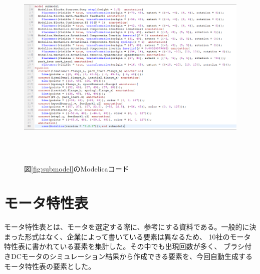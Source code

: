   \begin{figure}[t]
	\centering
	\includegraphics[width=16.5cm,height=10cm]{./Image/sub_modelica.png}
	\caption{図\ref{fig:submodel}のModelicaコード}
	\label{fig:sub_modelica}
  \end{figure}
\section{モータ特性表}\label{mortoku}
モータ特性表とは、モータを選定する際に、参考にする資料である\cite{仕様の見方}。一般的に決まった形式はなく、企業によって書いている要素は異なるため、
10社のモータ特性表\cite{特性表1,特性表2,特性表3,特性表4,特性表5,特性表6,特性表7,特性表8,特性表9,特性表10}に書かれている要素を集計した。その中でも出現回数が多く、
ブラシ付きDCモータのシミュレーション結果から作成できる要素を、今回自動生成するモータ特性表の要素とした。

